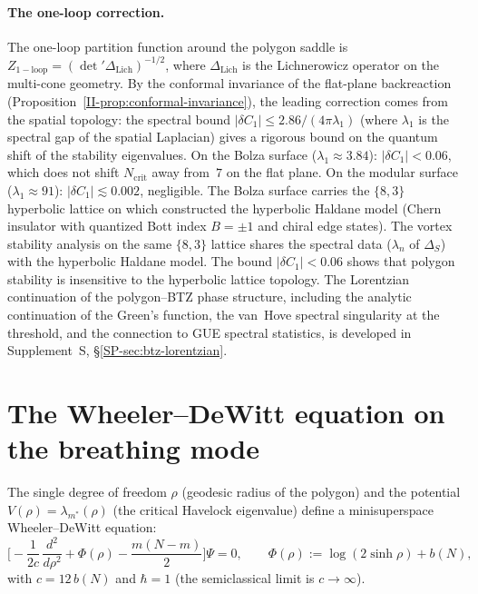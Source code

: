 \paragraph{The one-loop correction.}
The one-loop partition function around the polygon saddle is
$Z_{\mathrm{1-loop}} = (\det{}'\Delta_{\mathrm{Lich}})^{-1/2}$,
where $\Delta_{\mathrm{Lich}}$ is the Lichnerowicz operator
on the multi-cone geometry.
By the conformal invariance of the flat-plane
backreaction (Proposition~\ref{II-prop:conformal-invariance}),
the leading correction comes from the spatial topology:
the spectral bound
$|\delta C_1| \le 2.86/(4\pi\lambda_1)$
(where $\lambda_1$ is the spectral gap of the spatial
Laplacian) gives a rigorous bound on the quantum shift
of the stability eigenvalues.
On the Bolza surface ($\lambda_1 \approx 3.84$):
$|\delta C_1| < 0.06$, which does not shift
$N_{\mathrm{crit}}$ away from~$7$ on the flat plane.
On the modular surface ($\lambda_1 \approx 91$):
$|\delta C_1| \lesssim 0.002$, negligible.
The Bolza surface carries the $\{8,3\}$ hyperbolic lattice
on which \citet{Lenggenhager2023} constructed the
hyperbolic Haldane model (Chern insulator with quantized
Bott index $B = \pm 1$ and chiral edge states).
The vortex stability analysis on the same $\{8,3\}$
lattice shares the spectral data ($\lambda_n$ of $\Delta_S$)
with the hyperbolic Haldane model.
The bound $|\delta C_1| < 0.06$ shows that polygon
stability is insensitive to the hyperbolic lattice topology.
The Lorentzian continuation of the polygon--BTZ phase structure,
including the analytic continuation of the Green's function,
the van~Hove spectral singularity at the threshold, and the
connection to GUE spectral statistics, is developed in
Supplement~S, \S\ref*{SP-sec:btz-lorentzian}.

\section{The Wheeler--DeWitt equation on the breathing mode}
\label{sec:wdw}

The single degree of freedom $\rho$ (geodesic radius of the polygon)
and the potential $V(\rho) = \lambda_{m^*}(\rho)$ (the critical
Havelock eigenvalue) define a minisuperspace Wheeler--DeWitt equation:
\begin{equation}\label{eq:wdw}
  \biggl[-\frac{1}{2c}\,\frac{d^2}{d\rho^2}
  + \Phi(\rho) - \frac{m(N{-}m)}{2}
  \biggr]\Psi = 0,
  \qquad \Phi(\rho) := \log(2\sinh\rho) + b(N),
\end{equation}
with $c = 12\,b(N)$ and $\hbar = 1$
(the semiclassical limit is $c \to \infty$).

